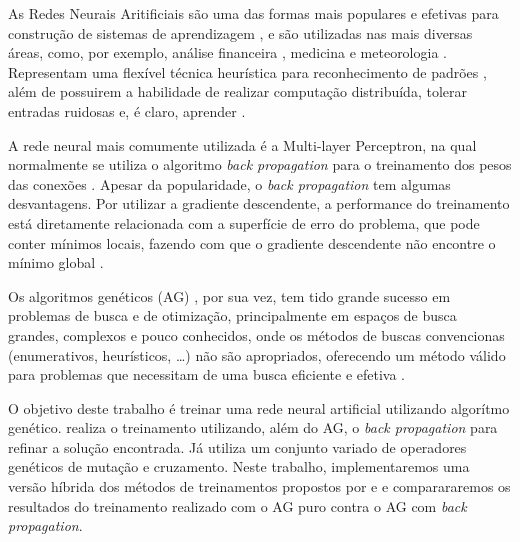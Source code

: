 \documentclass[12pt]{article}
\begin{document}
\par As Redes Neurais Aritificiais são uma das formas mais populares e efetivas para construção de sistemas de aprendizagem \cite{russel}, e são utilizadas nas mais diversas áreas, como, por exemplo, análise financeira \cite{bank}, medicina \cite{medic} e meteorologia \cite{forecast}. Representam uma flexível técnica heurística para reconhecimento de padrões \cite{duda}, além de possuirem a habilidade de realizar computação distribuída, tolerar entradas ruidosas e, é claro, aprender \cite{russel}.
\par A rede neural mais comumente utilizada é a Multi-layer Perceptron, na qual normalmente se utiliza o algoritmo \emph{back propagation} \cite{rumerhalt} para o treinamento dos pesos das conexões \cite{Liu}. Apesar da popularidade, o \emph{back propagation} tem algumas desvantagens. Por utilizar a gradiente descendente, a performance do treinamento está diretamente relacionada com a superfície de erro do problema, que pode conter mínimos locais, fazendo com que o gradiente descendente não encontre o mínimo global \cite{rumerhalt}.
\par Os algoritmos genéticos (AG) \cite{goldberg}, por sua vez, tem tido grande sucesso em problemas de busca e de otimização, principalmente em espaços de busca grandes, complexos e pouco conhecidos, onde os métodos de buscas convencionas (enumerativos, heurísticos, \dots) não são apropriados, oferecendo um método válido para pro\-ble\-mas que necessitam de uma busca eficiente e efetiva \cite{herrera}.
\par O objetivo deste trabalho é treinar uma rede neural artificial utilizando algorítmo genético. \cite{Liu} realiza o treinamento utilizando, além do AG, o \emph{back propagation} para refinar a solução encontrada. Já \cite{montana} utiliza um conjunto variado de operadores genéticos de mutação e cruzamento. Neste trabalho, implementaremos uma versão híbrida dos métodos de treinamentos propostos por \cite{Liu} e \cite{montana} e comparararemos os resultados do treinamento realizado com o AG puro contra o AG com \emph{back propagation}.

\end{document}
